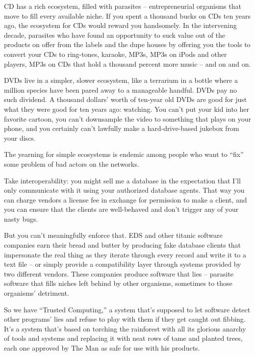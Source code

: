CD has a rich ecosystem, filled with parasites -- entrepreneurial
organisms that move to fill every available niche. If you spent a
thousand bucks on CDs ten years ago, the ecosystem for CDs would
reward you handsomely. In the intervening decade, parasites who
have found an opportunity to suck value out of the products on
offer from the labels and the dupe houses by offering you the tools
to convert your CDs to ring-tones, karaoke, MP3s, MP3s on iPods and
other players, MP3s on CDs that hold a thousand percent more music
-- and on and on.

DVDs live in a simpler, slower ecosystem, like a terrarium in a
bottle where a million species have been pared away to a manageable
handful. DVDs pay no such dividend. A thousand dollars' worth of
ten-year old DVDs are good for just what they were good for ten
years ago: watching. You can't put your kid into her favorite
cartoon, you can't downsample the video to something that plays on
your phone, and you certainly can't lawfully make a
hard-drive-based jukebox from your discs.

The yearning for simple ecosystems is endemic among people who want
to ``fix'' some problem of bad actors on the networks.

Take interoperability: you might sell me a database in the
expectation that I'll only communicate with it using your
authorized database agents. That way you can charge vendors a
license fee in exchange for permission to make a client, and you
can ensure that the clients are well-behaved and don't trigger any
of your nasty bugs.

But you can't meaningfully enforce that. EDS and other titanic
software companies earn their bread and butter by producing fake
database clients that impersonate the real thing as they iterate
through every record and write it to a text file -- or simply
provide a compatibility layer through systems provided by two
different vendors. These companies produce software that lies --
parasite software that fills niches left behind by other organisms,
sometimes to those organisms' detriment.

So we have ``Trusted Computing,'' a system that's supposed to let
software detect other programs' lies and refuse to play with them
if they get caught out fibbing. It's a system that's based on
torching the rainforest with all its glorious anarchy of tools and
systems and replacing it with neat rows of tame and planted trees,
each one approved by The Man as safe for use with his products.


